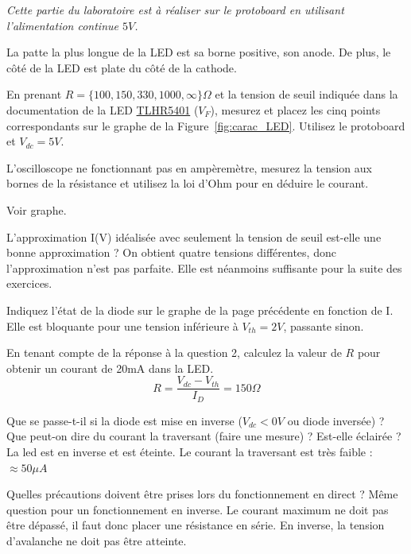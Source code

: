\documentclass{../template/labo}
\begin{document}
\begin{manip}
	
\textit{Cette partie du laboratoire est à réaliser sur le protoboard en utilisant l'alimentation continue $5V$.}

\begin{astuce}
	La patte la plus longue de la LED est sa borne positive, son anode.
	De plus, le côté de la LED est plate du côté de la cathode.
\end{astuce}


	
\Question
{
	En prenant $R=\lbrace 100, 150, 330, 1000, \infty \rbrace \Omega$ et la tension de seuil indiquée dans la documentation de la LED \href{http://www.vishay.com/docs/83012/tlhg540.pdf}{TLHR5401} ($V_F$), mesurez et placez les cinq points correspondants sur le graphe de la Figure~\vref{fig:carac_LED}. Utilisez le protoboard et $V_{dc}=5V$.

	\begin{astuce}
		L'oscilloscope ne fonctionnant pas en ampèremètre, mesurez la tension aux bornes de la résistance et utilisez la loi d'Ohm pour en déduire le courant.
	\end{astuce}
}
{Voir graphe.}%
	\label{Q:1}

\Question
{
	L'approximation I(V) idéalisée avec seulement la tension de seuil est-elle une bonne approximation ?
}
{On obtient quatre tensions différentes, donc l'approximation n'est pas parfaite.
Elle est néanmoins suffisante pour la suite des exercices.}%
	\label{Q:2}

\Question
{
	Indiquez l'état de la diode sur le graphe de la page précédente en fonction de I.
}
{Elle est bloquante pour une tension inférieure à $V_{th} = 2 V$, passante sinon.}
	\label{Q:3}
	
\Question
{
	En tenant compte de la réponse à la question 2, calculez la valeur de $R$ pour obtenir un courant de 20mA dans la LED.	
}
{$$R=\frac{V_{dc}-V_{th}}{I_D}=150\Omega$$}%
	\label{Q:4}

\Question
{
	Que se passe-t-il si la diode est mise en inverse ($V_{dc}<0V$ ou diode inversée) ?  Que peut-on dire du courant la traversant (faire une mesure) ? Est-elle éclairée ?
}
{La led est en inverse et est éteinte. Le courant la traversant est très faible : $\approx 50\mu A$ }%
	\label{Q:5}

\Question
{
	Quelles précautions doivent être prises lors du fonctionnement en direct ? Même question pour un fonctionnement en inverse.
}
{Le courant maximum ne doit pas être dépassé, il faut donc placer une résistance en série. En inverse, la tension d'avalanche ne doit pas être atteinte.}%
	\label{Q:6}

\end{manip}
\end{document}
